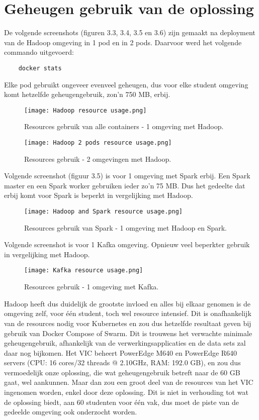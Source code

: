 \section{Geheugen gebruik van de oplossing}
De volgende screenshots (figuren 3.3, 3.4, 3.5 en 3.6) zijn gemaakt na deployment van de Hadoop omgeving in 1 pod en in 2 pods. Daarvoor werd het volgende commando uitgevoerd:
\begin{lstlisting}
    docker stats
\end{lstlisting}

Elke pod gebruikt ongeveer evenveel geheugen, dus voor elke student omgeving komt hetzelfde geheugengebruik, zon'n 750 MB, erbij.

\begin{figure}[H]
    \texttt{[image: Hadoop resource usage.png]}
    \caption{Resources gebruik van alle containers - 1 omgeving met Hadoop.}
\end{figure}

\begin{figure}[H]
    \texttt{[image: Hadoop 2 pods resource usage.png]}
    \caption{Resources gebruik - 2 omgevingen met Hadoop.}
\end{figure}

Volgende screenshot (figuur 3.5) is voor 1 omgeving met Spark erbij. Een Spark master en een Spark worker gebruiken ieder zo'n 75 MB. Dus het gedeelte dat erbij komt voor Spark is beperkt in vergelijking met Hadoop.
\begin{figure}[H]
    \texttt{[image: Hadoop and Spark resource usage.png]}
    \caption{Resources gebruik van Spark - 1 omgeving met Hadoop en Spark.}
\end{figure}

Volgende screenshot is voor 1 Kafka omgeving. Opnieuw veel beperkter gebruik in vergelijking met Hadoop.
\begin{figure}[H]
    \texttt{[image: Kafka resource usage.png]}
    \caption{Resources gebruik - 1 omgeving met Kafka.}
\end{figure}

Hadoop heeft dus duidelijk de grootste invloed en alles bij elkaar genomen is de omgeving zelf, voor \'e\'en student, toch wel resource intensief. Dit is onafhankelijk van de resources nodig voor Kubernetes en zou dus hetzelfde resultaat geven bij gebruik van Docker Compose of Swarm.
\newline
Dit is trouwens het verwachte minimale geheugengebruik, afhankelijk van de verwerkingsapplicaties en de data sets zal daar nog bijkomen.
\newline
Het VIC beheert PowerEdge M640 en PowerEdge R640 servers (CPU: 16 cores/32 threads @ 2.10GHz, RAM: 192.0 GB), en zou dus vermoedelijk onze oplossing, die wat geheugengebruik betreft naar de 60 GB gaat, wel aankunnen.
Maar dan zou een groot deel van de resources van het VIC ingenomen worden, enkel door deze oplossing. Dit is niet in verhouding tot wat de oplossing biedt, aan 60 studenten voor \'e\'en vak, dus moet de piste van de gedeelde omgeving ook onderzocht worden.

